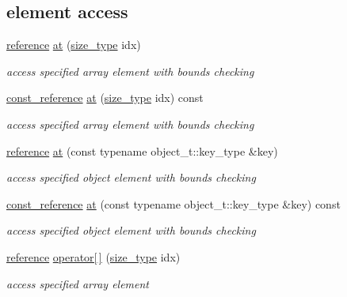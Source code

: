 \subsection*{element access}
\begin{DoxyCompactItemize}
\item 
\hyperlink{a00025_a3ec8e17be8732fe436e9d6733f52b7a3}{reference} \hyperlink{a00025_a214a8c22d616fd3567b88932c07436c9}{at} (\hyperlink{a00025_a1579a8f72a230358d6cd1a6e8a62859b}{size\+\_\+type} idx)
\begin{DoxyCompactList}\small\item\em access specified array element with bounds checking \end{DoxyCompactList}\item 
\hyperlink{a00025_af677a29b0e66edc9f66e5167e4667071}{const\+\_\+reference} \hyperlink{a00025_ab31368c0b67f8e4f291a45e6498018be}{at} (\hyperlink{a00025_a1579a8f72a230358d6cd1a6e8a62859b}{size\+\_\+type} idx) const 
\begin{DoxyCompactList}\small\item\em access specified array element with bounds checking \end{DoxyCompactList}\item 
\hyperlink{a00025_a3ec8e17be8732fe436e9d6733f52b7a3}{reference} \hyperlink{a00025_a7ed92d56cb313b243c1917696ffdf074}{at} (const typename object\+\_\+t\+::key\+\_\+type \&key)
\begin{DoxyCompactList}\small\item\em access specified object element with bounds checking \end{DoxyCompactList}\item 
\hyperlink{a00025_af677a29b0e66edc9f66e5167e4667071}{const\+\_\+reference} \hyperlink{a00025_a674de1ee73e6bf4843fc5dc1351fb726}{at} (const typename object\+\_\+t\+::key\+\_\+type \&key) const 
\begin{DoxyCompactList}\small\item\em access specified object element with bounds checking \end{DoxyCompactList}\item 
\hyperlink{a00025_a3ec8e17be8732fe436e9d6733f52b7a3}{reference} \hyperlink{a00025_a59732a1de287a7301cca19a7a7748159}{operator\mbox{[}$\,$\mbox{]}} (\hyperlink{a00025_a1579a8f72a230358d6cd1a6e8a62859b}{size\+\_\+type} idx)
\begin{DoxyCompactList}\small\item\em access specified array element \end{DoxyCompactList}\item 

\end{DoxyCompactItemize}
